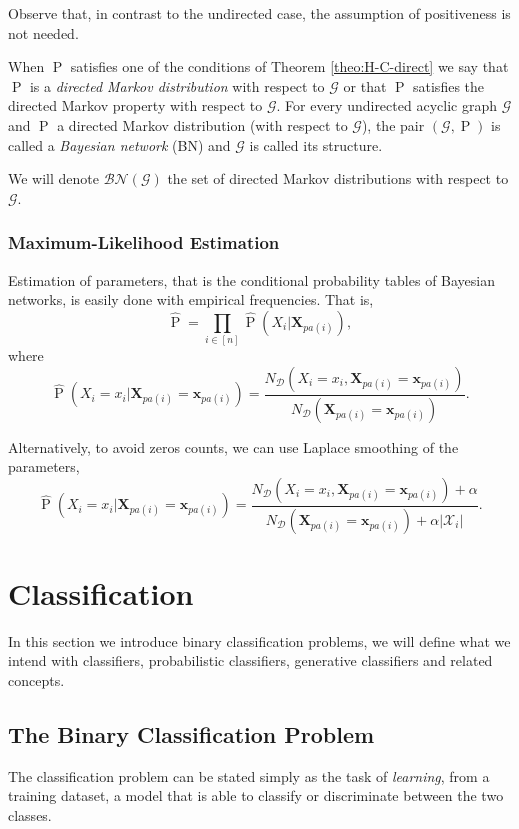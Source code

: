\documentclass[11pt,a4paper, twoside]{book}
\newcommand{\Pp}{\operatorname{P}}
\newcommand{\bx}{\mathbf{x}}
\newcommand{\bX}{\mathbf{X}}
\newcommand{\nchi}{\mathcal{X}}
\begin{document}
Observe that, in contrast to the undirected case, the assumption of positiveness is not needed. 

When $\Pp$ satisfies one of the conditions of Theorem \ref{theo:H-C-direct} we say that $\Pp$ is a \textit{directed Markov distribution} with respect to $\mathcal{G}$ or that $\Pp$ satisfies the directed Markov property with respect to $\mathcal{G}$.
For every undirected acyclic graph $\mathcal{G}$ and $\Pp$ a directed Markov distribution (with respect to $\mathcal{G}$), the pair $(\mathcal{G}, \Pp)$ is called a \textit{Bayesian network} (BN) and $\mathcal{G}$ is called its structure.

We will denote $\mathcal{BN}(\mathcal{G})$ the set of directed Markov distributions with respect to $\mathcal{G}$.

\subsubsection{Maximum-Likelihood Estimation}

Estimation of parameters, that is the conditional probability tables of Bayesian networks, is easily done with empirical frequencies. That is,
$$\hat{\Pp} =  \prod_{i \in [n]} \hat{\Pp}(X_i | \bX_{pa(i)}),$$
where
$$ \hat{\Pp}(X_i=x_i | \bX_{pa(i)}=\bx_{pa(i)}) = \frac{N_{\mathcal{D}}(X_i=x_i , \bX_{pa(i)}=\bx_{pa(i)})}{N_{\mathcal{D}}(\bX_{pa(i)}=\bx_{pa(i)})}.$$

Alternatively, to avoid zeros counts, we can use Laplace smoothing of the parameters,
$$\hat{\Pp}(X_i=x_i | \bX_{pa(i)}=\bx_{pa(i)}) = \frac{N_{\mathcal{D}}(X_i=x_i , \bX_{pa(i)}=\bx_{pa(i)}) + \alpha}{N_{\mathcal{D}}(\bX_{pa(i)}=\bx_{pa(i)})+ \alpha|\nchi_i|}.$$

\section{Classification}
\label{sec:classification}

In this section we introduce binary classification problems, we will define what we intend with classifiers, probabilistic classifiers, generative classifiers and related concepts.


\subsection{The Binary Classification Problem}

The classification problem can be stated simply as the task of \textit{learning}, from a training dataset, a model that is able to classify or discriminate between the two classes.
\end{document}
